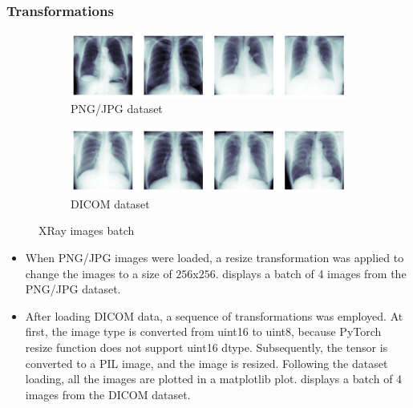     \subsubsection*{Transformations}
        \begin{figure}[b]
            \begin{subfigure}[t]{\linewidth}
                \centering
                \includegraphics[width=\linewidth]{images/chest-xray-output.png}
                \caption{PNG/JPG dataset}
                \label{fig:png-image}    
            \end{subfigure}
            \begin{subfigure}[t]{\linewidth}
                \centering
                \includegraphics[width=\linewidth]{images/dicom.png}
                \caption{DICOM dataset}
                \label{fig:dicom-image}
            \end{subfigure}
            \caption{XRay images batch}
            \label{fig:xray-images}
        \end{figure}
        \begin{itemize}
            \item When PNG/JPG images were loaded, a resize transformation was applied to change the images to a size of $256$x$256$.  displays a batch of 4 images from the PNG/JPG dataset.
            \item After loading DICOM data, a sequence of transformations was employed. At first, the image type is converted from uint16 to uint8, because PyTorch resize function does not support uint16 dtype. Subsequently, the tensor is converted to a PIL image, and the image is resized. Following the dataset loading, all the images are plotted in a matplotlib plot.  displays a batch of 4 images from the DICOM dataset.
        \end{itemize}
    